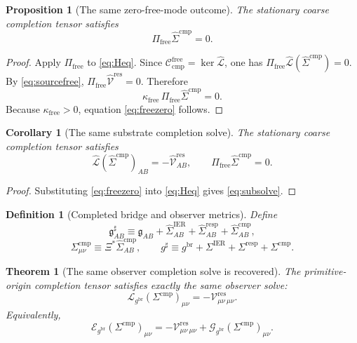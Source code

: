 \documentclass[11pt]{article}
\newcommand{\ObserverMap}{\Xi}
\newcommand{\BridgeMetric}{\mathfrak g}
\newcommand{\ObserverMetric}{g^{\mathrm{br}}}
\newcommand{\CompletedMetric}{g^{\sharp}}
\newcommand{\BaseShift}{\Sigma^{\mathrm{IER}}}
\newcommand{\ResponseShift}{\Sigma^{\mathrm{resp}}}
\newcommand{\CompShift}{\Sigma^{\mathrm{cmp}}}
\newcommand{\BaseLift}{\widehat\Sigma^{\mathrm{IER}}}
\newcommand{\ResponseLift}{\widehat\Sigma^{\mathrm{resp}}}
\newcommand{\CompLift}{\widehat\Sigma^{\mathrm{cmp}}}
\newcommand{\ResidualCore}{\mathcal V_{\mu\nu}^{\mathrm{res}}}
\newcommand{\ResidualLift}{\widehat{\mathcal V}^{\mathrm{res}}}
\newcommand{\SubReducedEin}{\widehat{\mathcal L}}
\newcommand{\FreeProj}{\Pi_{\mathrm{free}}}
\newcommand{\ReducedEin}{\mathcal L_{\ObserverMetric}}
\newcommand{\GaugeBook}{\mathcal G_{\ObserverMetric}}
\newcommand{\EinLin}{\mathcal E_{\ObserverMetric}}
\newcommand{\CompFree}{\mathscr C_{\mathrm{cmp}}^{\mathrm{free}}}
\newcommand{\FreeStiff}{\kappa_{\mathrm{free}}}
\newtheorem{definition}{Definition}
\newtheorem{proposition}{Proposition}
\newtheorem{corollary}{Corollary}
\newtheorem{theorem}{Theorem}
\begin{document}
\begin{proposition}[The same zero-free-mode outcome]
\label{prop:freezero}
The stationary coarse completion tensor satisfies
\begin{equation}
\FreeProj\CompLift=0.
\label{eq:freezero}
\end{equation}
\end{proposition}

\begin{proof}
Apply \(\FreeProj\) to \eqref{eq:Heq}. Since \(\CompFree=\ker\SubReducedEin\), one has \(\FreeProj\SubReducedEin(\CompLift)=0\). By \eqref{eq:sourcefree}, \(\FreeProj\ResidualLift=0\). Therefore
\[
\FreeStiff\,\FreeProj\CompLift=0.
\]
Because \(\FreeStiff>0\), equation \eqref{eq:freezero} follows.
\end{proof}

\begin{corollary}[The same substrate completion solve]
\label{cor:subsolve}
The stationary coarse completion tensor satisfies
\begin{equation}
\SubReducedEin(\CompLift)_{AB}
=
-\ResidualLift_{AB},
\qquad
\FreeProj\CompLift=0.
\label{eq:subsolve}
\end{equation}
\end{corollary}

\begin{proof}
Substituting \eqref{eq:freezero} into \eqref{eq:Heq} gives \eqref{eq:subsolve}.
\end{proof}

\begin{definition}[Completed bridge and observer metrics]
\label{def:completed}
Define
\begin{equation}
\BridgeMetric_{AB}^{\sharp}
\equiv
\BridgeMetric_{AB}
+\BaseLift_{AB}
+\ResponseLift_{AB}
+\CompLift_{AB},
\label{eq:bridgecompleted}
\end{equation}
\begin{equation}
\CompShift_{\mu\nu}
\equiv
\ObserverMap^*\CompLift_{AB},
\qquad
\CompletedMetric
\equiv
\ObserverMetric+\BaseShift+\ResponseShift+\CompShift.
\label{eq:defsigma}
\end{equation}
\end{definition}

\begin{theorem}[The same observer completion solve is recovered]
\label{thm:observer}
The primitive-origin completion tensor satisfies exactly the same observer solve:
\begin{equation}
\ReducedEin(\CompShift)_{\mu\nu}
=
-\ResidualCore{}_{\mu\nu}.
\label{eq:observereq}
\end{equation}
Equivalently,
\begin{equation}
\EinLin(\CompShift)_{\mu\nu}
=
-\ResidualCore{}_{\mu\nu}
+\GaugeBook(\CompShift)_{\mu\nu}.
\label{eq:linsolve}
\end{equation}
\end{theorem}
\end{document}

